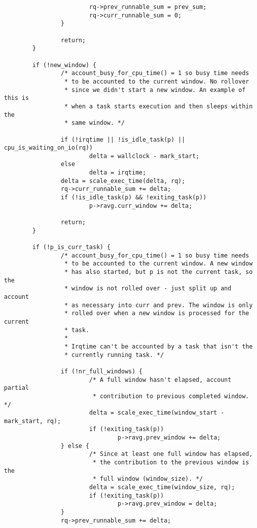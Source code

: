 \documentclass{article}
\begin{document}
\begin{verbatim}
                        rq->prev_runnable_sum = prev_sum;
                        rq->curr_runnable_sum = 0;
                }

                return;
        }

        if (!new_window) {
                /* account_busy_for_cpu_time() = 1 so busy time needs
                 * to be accounted to the current window. No rollover
                 * since we didn't start a new window. An example of this is
                 * when a task starts execution and then sleeps within the
                 * same window. */

                if (!irqtime || !is_idle_task(p) || cpu_is_waiting_on_io(rq))
                        delta = wallclock - mark_start;
                else
                        delta = irqtime;
                delta = scale_exec_time(delta, rq);
                rq->curr_runnable_sum += delta;
                if (!is_idle_task(p) && !exiting_task(p))
                        p->ravg.curr_window += delta;
                        
                return;
        }

        if (!p_is_curr_task) {
                /* account_busy_for_cpu_time() = 1 so busy time needs
                 * to be accounted to the current window. A new window
                 * has also started, but p is not the current task, so the
                 * window is not rolled over - just split up and account
                 * as necessary into curr and prev. The window is only
                 * rolled over when a new window is processed for the current
                 * task.
                 *
                 * Irqtime can't be accounted by a task that isn't the
                 * currently running task. */

                if (!nr_full_windows) {
                        /* A full window hasn't elapsed, account partial
                         * contribution to previous completed window. */
                        delta = scale_exec_time(window_start - mark_start, rq);
                        if (!exiting_task(p))
                                p->ravg.prev_window += delta;
                } else {
                        /* Since at least one full window has elapsed,
                         * the contribution to the previous window is the
                         * full window (window_size). */
                        delta = scale_exec_time(window_size, rq);
                        if (!exiting_task(p))
                                p->ravg.prev_window = delta;
                }
                rq->prev_runnable_sum += delta;


\end{verbatim}
\end{document}
